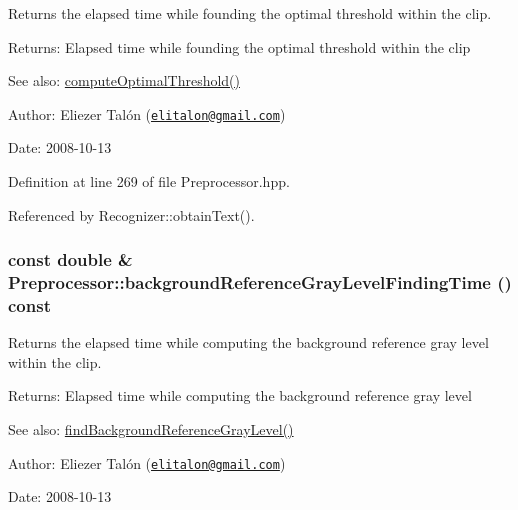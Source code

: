 Returns the elapsed time while founding the optimal threshold within the clip. 

\begin{Desc}
\item[Returns:]Elapsed time while founding the optimal threshold within the clip\end{Desc}
\begin{Desc}
\item[See also:]\hyperlink{class_preprocessor_aaeb94a3b52b835bc26efebb40be25bc}{computeOptimalThreshold()}\end{Desc}
\begin{Desc}
\item[Author:]Eliezer Talón (\href{mailto:elitalon@gmail.com}{\tt elitalon@gmail.com}) \end{Desc}
\begin{Desc}
\item[Date:]2008-10-13 \end{Desc}


Definition at line 269 of file Preprocessor.hpp.

Referenced by Recognizer::obtainText().\hypertarget{class_preprocessor_2cb04f2116b4afc783ff070026bc1297}{
\subsubsection[backgroundReferenceGrayLevelFindingTime]{\setlength{\rightskip}{0pt plus 5cm}const double \& Preprocessor::backgroundReferenceGrayLevelFindingTime () const}}
\label{class_preprocessor_2cb04f2116b4afc783ff070026bc1297}


Returns the elapsed time while computing the background reference gray level within the clip. 

\begin{Desc}
\item[Returns:]Elapsed time while computing the background reference gray level\end{Desc}
\begin{Desc}
\item[See also:]\hyperlink{class_preprocessor_a941f81382bd8e235e4dd12481342be4}{findBackgroundReferenceGrayLevel()}\end{Desc}
\begin{Desc}
\item[Author:]Eliezer Talón (\href{mailto:elitalon@gmail.com}{\tt elitalon@gmail.com}) \end{Desc}
\begin{Desc}
\item[Date:]2008-10-13 \end{Desc}


